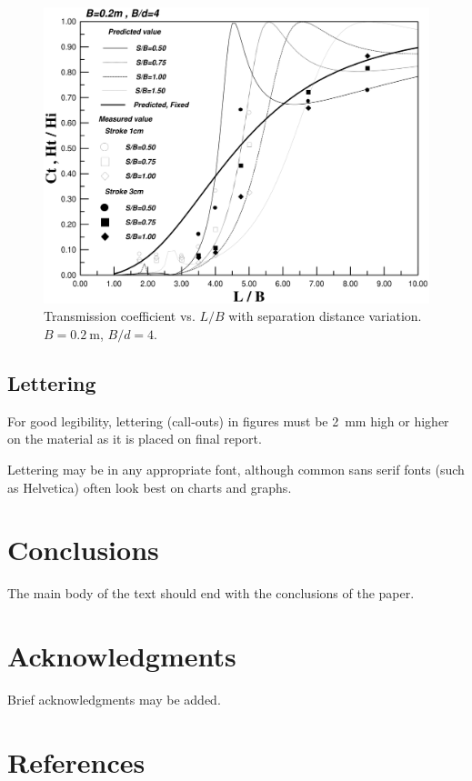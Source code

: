 \documentclass[bibtex,pagenumbers]{stabs2021}
\begin{document}
\begin{figure}[ht]
  \centering
  \includegraphics[width=\linewidth]{stabsgraph.png}
  \caption{Transmission coefficient vs. \(L/B\) with separation
    distance variation. \(B = 0.2~\mathrm{m}\), \(B/d = 4\).}
  \label{fig:example-figure}
\end{figure}

\subsection{Lettering}

For good legibility, lettering (call-outs) in figures must be 2~mm
high or higher on the material as it is placed on final report.

Lettering may be in any appropriate font, although common sans serif
fonts (such as Helvetica) often look best on charts and graphs.

\section{Conclusions}

The main body of the text should end with the conclusions of the
paper.

\section{Acknowledgments}

Brief acknowledgments may be added.

\section{References}
\end{document}
